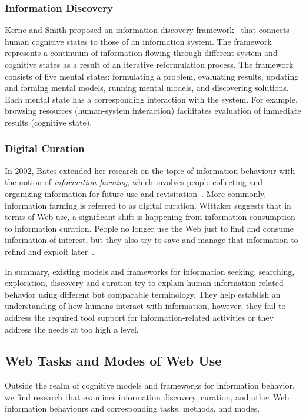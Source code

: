 \documentclass{sigchi}
\begin{document}
\subsubsection{Information Discovery}
Kerne and Smith proposed an information discovery framework~\cite{kerne2004information} that connects human cognitive states 
to those of an information system. The framework represents a continuum of information flowing through different system and cognitive states as a result of an iterative reformulation process. The framework consists of five mental states: formulating a problem, evaluating results, updating and forming mental models, running mental models, and discovering solutions. Each mental state has a corresponding interaction with the system. For example, browsing resources (human-system interaction) facilitates evaluation of immediate results (cognitive state). 
   
\subsubsection{Digital Curation}
In 2002, Bates extended her research on the topic of information behaviour with the notion of \textit{information farming}, which involves people collecting and organizing information for future use and revisitation~\cite{bates2002toward}. More commonly, information farming is referred to as digital curation. 
%
Wittaker suggests that in terms of Web use, a significant shift is happening from information consumption to information curation. People no longer use the Web just to find and consume information of interest, but they also try to save and manage that information to refind and exploit later~\cite{whittaker2011personal}. 

In summary, existing models and frameworks for information seeking, searching, exploration, discovery and curation try to explain human information-related behavior using different but comparable terminology. They help establish an understanding of how humans interact with information, however, they fail to address the required tool support for information-related activities or they address the needs at too high a level.  

\subsection{Web Tasks and Modes of Web Use}
Outside the realm of cognitive models and frameworks for information behavior, we find research that examines information discovery, curation, and other Web information behaviours and corresponding tasks, methods, and modes.
\end{document}
